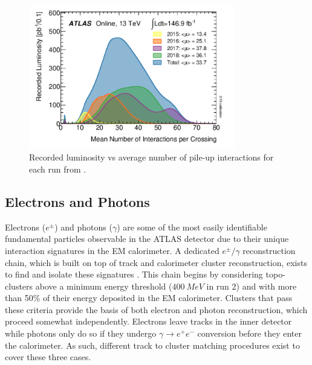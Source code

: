\begin{figure}
\centering
    \includegraphics[width=0.8\textwidth]{images/Luminosity_vs_Pileup.png}
    \caption{Recorded luminosity vs average number of pile-up interactions for each run from 
    \cite{atlas-run3-setup}.}
    \label{fig:Luminosity_vs_Pileup}
\end{figure}

\subsection{Electrons and Photons}

Electrons ($e^{\pm}$) and photons ($\gamma$) are some of the most easily identifiable fundamental particles 
observable in the ATLAS detector due to their unique interaction signatures in the EM calorimeter. A dedicated 
$e^{\pm}/\gamma$ reconstruction chain, which is built on top of track and calorimeter cluster reconstruction, exists to 
find and isolate these signatures \cite{atlas-electrons-photons-reco}. This chain begins by considering topo-clusters 
above a minimum energy threshold ($400\ MeV$ in run 2) and with more than 50\% of their energy deposited in the EM 
calorimeter. Clusters that pass these criteria provide the basis of both electron and photon reconstruction, which 
proceed somewhat independently. Electrons leave tracks in the inner detector while photons only do so if they undergo 
$\gamma \rightarrow e^+e^-$ conversion before they enter the calorimeter. As such, different track to cluster matching 
procedures exist to cover these three cases. \par

